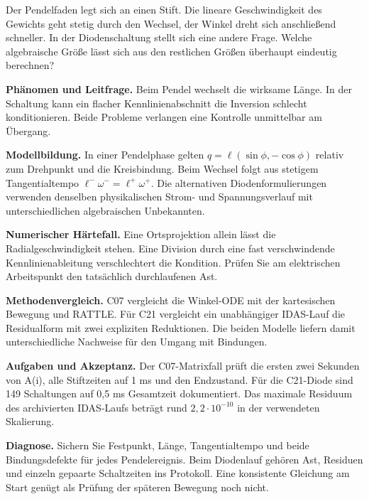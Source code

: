 Der Pendelfaden legt sich an einen Stift. Die lineare Geschwindigkeit des Gewichts geht stetig durch den Wechsel, der Winkel dreht sich anschließend schneller. In der Diodenschaltung stellt sich eine andere Frage. Welche algebraische Größe lässt sich aus den restlichen Größen überhaupt eindeutig berechnen?
\par\textsf{\bfseries\color{sea}Phänomen und Leitfrage.} Beim Pendel wechselt die wirksame Länge. In der Schaltung kann ein flacher Kennlinienabschnitt die Inversion schlecht konditionieren. Beide Probleme verlangen eine Kontrolle unmittelbar am Übergang.
\par\textsf{\bfseries\color{sea}Modellbildung.} In einer Pendelphase gelten \(q=\ell(\sin\phi,-\cos\phi)\) relativ zum Drehpunkt und die Kreisbindung. Beim Wechsel folgt aus stetigem Tangentialtempo \(\ell^-\omega^-=\ell^+\omega^+\). Die alternativen Diodenformulierungen verwenden denselben physikalischen Strom- und Spannungsverlauf mit unterschiedlichen algebraischen Unbekannten.
\par\textsf{\bfseries\color{sea}Numerischer Härtefall.} Eine Ortsprojektion allein lässt die Radialgeschwindigkeit stehen. Eine Division durch eine fast verschwindende Kennlinienableitung verschlechtert die Kondition. Prüfen Sie am elektrischen Arbeitspunkt den tatsächlich durchlaufenen Ast.
\par\textsf{\bfseries\color{sea}Methodenvergleich.} C07 vergleicht die Winkel-ODE mit der kartesischen Bewegung und RATTLE. Für C21 vergleicht ein unabhängiger IDAS-Lauf die Residualform mit zwei expliziten Reduktionen. Die beiden Modelle liefern damit unterschiedliche Nachweise für den Umgang mit Bindungen.
\par\textsf{\bfseries\color{sea}Aufgaben und Akzeptanz.} Der C07-Matrixfall prüft die ersten zwei Sekunden von A(i), alle Stiftzeiten auf 1 ms und den Endzustand. Für die C21-Diode sind 149 Schaltungen auf 0,5 ms Gesamtzeit dokumentiert. Das maximale Residuum des archivierten IDAS-Laufs beträgt rund \(2{,}2\cdot10^{-10}\) in der verwendeten Skalierung.
\par\textsf{\bfseries\color{sea}Diagnose.} Sichern Sie Festpunkt, Länge, Tangentialtempo und beide Bindungsdefekte für jedes Pendelereignis. Beim Diodenlauf gehören Ast, Residuen und einzeln gepaarte Schaltzeiten ins Protokoll. Eine konsistente Gleichung am Start genügt als Prüfung der späteren Bewegung noch nicht.


